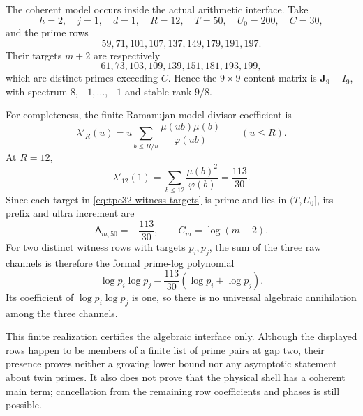The coherent model occurs inside the actual arithmetic interface.  Take
\begin{equation}
 h=2,
 \quad j=1,
 \quad d=1,
 \quad R=12,
 \quad T=50,
 \quad U_0=200,
 \quad C=30,
 \label{eq:tpc32-witness-parameters}
\end{equation}
and the prime rows
\begin{equation}
 59,71,101,107,137,149,179,191,197.
 \label{eq:tpc32-witness-rows}
\end{equation}
Their targets $m+2$ are respectively
\begin{equation}
 61,73,103,109,139,151,181,193,199,
 \label{eq:tpc32-witness-targets}
\end{equation}
which are distinct primes exceeding $C$.  Hence the $9\times9$ content
matrix is $\mathbf J_9-I_9$, with spectrum $8,-1,\ldots,-1$ and stable
rank $9/8$.

For completeness, the finite Ramanujan-model divisor coefficient is
\begin{equation}
 \lambda'_R(u)
 =u\sum_{b\le R/u}\frac{\mu(ub)\mu(b)}{\varphi(ub)}
 \qquad(u\le R).
 \label{eq:tpc32-lambda-prime}
\end{equation}
At $R=12$,
\begin{equation}
 \lambda'_{12}(1)
 =\sum_{b\le12}\frac{\mu(b)^2}{\varphi(b)}
 =\frac{113}{30}.
 \label{eq:tpc32-lambda-113}
\end{equation}
Since each target in \eqref{eq:tpc32-witness-targets} is prime and lies in
$(T,U_0]$, its prefix and ultra increment are
\begin{equation}
 \mathsf A_{m,50}=-\frac{113}{30},
 \qquad
 C_m=\log(m+2).
 \label{eq:tpc32-witness-prefix-tail}
\end{equation}
For two distinct witness rows with targets $p_i,p_j$, the sum of the three
raw channels is therefore the formal prime-log polynomial
\begin{equation}
 \boxed{
 \log p_i\log p_j
 -\frac{113}{30}(\log p_i+\log p_j).}
 \label{eq:tpc32-witness-polynomial}
\end{equation}
Its coefficient of $\log p_i\log p_j$ is one, so there is no universal
algebraic annihilation among the three channels.

This finite realization certifies the algebraic interface only.  Although
the displayed rows happen to be members of a finite list of prime pairs at
gap two, their presence proves neither a growing lower bound nor any
asymptotic statement about twin primes.  It also does not prove that the
physical shell has a coherent main term; cancellation from the remaining
row coefficients and phases is still possible.


